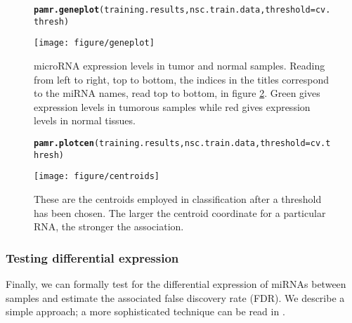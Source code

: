 \documentclass[12pt,english]{article}\usepackage{graphicx, color}
\makeatletter
\def\maxwidth{ %
  \ifdim\Gin@nat@width>\linewidth
    \linewidth
  \else
    \Gin@nat@width
  \fi
}
\newcommand{\hlfunctioncall}[1]{\textcolor[rgb]{0.501960784313725,0,0.329411764705882}{\textbf{#1}}}%
\newenvironment{kframe}{%
 \def\at@end@of@kframe{}%
 \ifinner\ifhmode%
  \def\at@end@of@kframe{\end{minipage}}%
  \begin{minipage}{\columnwidth}%
 \fi\fi%
 \def\FrameCommand##1{\hskip\@totalleftmargin \hskip-\fboxsep
 \colorbox{shadecolor}{##1}\hskip-\fboxsep
     \hskip-\linewidth \hskip-\@totalleftmargin \hskip\columnwidth}%
 \MakeFramed {\advance\hsize-\width
   \@totalleftmargin\z@ \linewidth\hsize
   \@setminipage}}%
 {\par\unskip\endMakeFramed%
 \at@end@of@kframe}
\newenvironment{knitrout}{}{} %
\numberwithin{equation}{section}
\numberwithin{figure}{section}
\theoremstyle{plain}
\theoremstyle{remark}
\makeatother
\begin{document}
\begin{spacing}{1}
\begin{figure}
\begin{knitrout}
\color{fgcolor}\begin{kframe}
\begin{alltt}
\hlfunctioncall{pamr.geneplot}(training.results, nsc.train.data, threshold = cv.thresh)
\end{alltt}
\end{kframe}
\texttt{[image: figure/geneplot]} 

\end{knitrout}

\caption{microRNA expression levels in tumor and normal samples.
  Reading from left to right, top to bottom, the indices in the titles
  correspond to the miRNA names, read top to bottom,  in figure
  \ref{fig:centroids}. Green gives expression levels in tumorous
  samples while red gives expression levels in normal tissues.}
\label{fig:geneplot}
\end{figure}
\end{spacing}

\begin{spacing}{1}
\begin{figure}
\begin{knitrout}
\color{fgcolor}\begin{kframe}
\begin{alltt}
\hlfunctioncall{pamr.plotcen}(training.results, nsc.train.data, threshold = cv.thresh)
\end{alltt}
\end{kframe}
\texttt{[image: figure/centroids]} 

\end{knitrout}

\caption{These are the centroids employed in classification after a
  threshold has been chosen. The larger the centroid coordinate for a
  particular RNA, the stronger the association.}
\label{fig:centroids}
\end{figure}
\end{spacing}

\subsubsection{Testing differential expression}

Finally, we can formally test for the differential expression of
miRNAs between samples and estimate the associated false discovery
rate (FDR). We describe a simple approach; a more sophisticated technique
can be read in \cite{witten2010ultra}.
\end{document}
